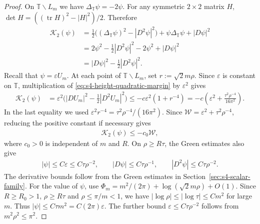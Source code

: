 \documentclass[a4paper,11pt,oneside,reqno]{amsart}
\numberwithin{equation}{section}
\theoremstyle{definition}
\begin{document}
\begin{proof}
    On $\mathbb T\smallsetminus L_m$ we have
    $\Delta_{\mathbb T}\psi=-2\psi$. For any symmetric
    $2\times2$ matrix $H$,
    $\det H=((\operatorname{tr}H)^2-|H|^2)/2$.
    Therefore
    \begin{align*}
        \mathcal K_2(\psi)
        &=\tfrac12\bigl((\Delta_{\mathbb T}\psi)^2
            -|D^2\psi|^2\bigr)
            +\psi\Delta_{\mathbb T}\psi+|D\psi|^2\\
        &=2\psi^2-\tfrac12|D^2\psi|^2
            -2\psi^2+|D\psi|^2\\
        &=|D\psi|^2-\tfrac12|D^2\psi|^2.
    \end{align*}
    Recall that $\psi=\varepsilon U_m$. At each point
    of $\mathbb T\smallsetminus L_m$, set
    $r:=\sqrt2m\rho$. Since $\varepsilon$ is constant on
    $\mathbb T$, multiplication of
    \eqref{eq:s4-height-quadratic-margin} by
    $\varepsilon^2$ gives
    \begin{align*}
        \mathcal K_2(\psi)
        &=\varepsilon^2\bigl(|DU_m|^2-\tfrac12|D^2U_m|^2\bigr)\leq-c\varepsilon^2(1+r^{-4})
        =-c\left(\varepsilon^2
             +\frac{\tau^2\rho^{-4}}{16\pi^2}\right).
    \end{align*}
    In the last equality we used
    $\varepsilon^2r^{-4}=\tau^2\rho^{-4}/(16\pi^2)$.
    Since $\mathcal W=\varepsilon^2+\tau^2\rho^{-4}$,
    reducing the positive constant if necessary gives
    \begin{align}
        \label{eq:s4-Green-curvature-margin}
        \mathcal K_2(\psi)\leq-c_0\mathcal W,
    \end{align}
    where $c_0>0$ is independent of $m$ and $R$.
    On $\rho\geq R\tau$, the Green estimates also give
    \begin{align*}
        |\psi|\leq C\varepsilon\leq C\tau\rho^{-2},\qquad
        |D\psi|\leq C\tau\rho^{-1},\qquad
        |D^2\psi|\leq C\tau\rho^{-2}.
    \end{align*}
    The derivative bounds follow from the Green estimates
    in Section~\ref{sec:s4-scalar-family}. For the value
    of $\psi$, use
    $\Phi_m=m^2/(2\pi)+\log(\sqrt2m\rho)+O(1)$.
    Since $R\geq R_0>1$, $\rho\geq R\tau$ and
    $\rho\leq\pi/m<1$, we have
    $|\log\rho|\leq|\log\tau|\leq Cm^2$ for large $m$.
    Thus $|\psi|\leq C\tau m^2=C(2\pi)\varepsilon$.
    The further bound $\varepsilon\leq C\tau\rho^{-2}$
    follows from $m^2\rho^2\leq\pi^2$.


\end{proof}
\end{document}
